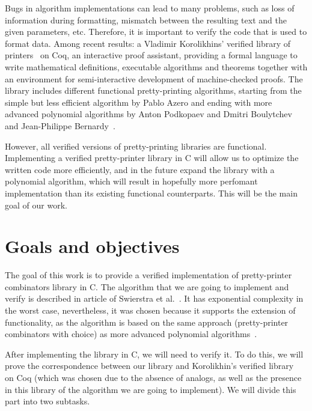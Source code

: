\documentclass[14pt]{constructor-diploma}
\begin{document}
Bugs in algorithm implementations can lead to many problems, such as loss of information during formatting,
mismatch between the resulting text and the given parameters, etc. Therefore, it is important to verify 
the code that is used to format data.
Among recent results: a Vladimir Korolikhins' verified library of printers~\cite{korolihin} on Coq, an interactive proof assistant, 
providing a formal language to write mathematical definitions, executable algorithms and theorems together with an environment for semi-interactive development of machine-checked proofs. 
The library includes different functional pretty-printing algorithms,
starting from the simple but less efficient algorithm by Pablo Azero and ending 
with more advanced polynomial algorithms by Anton Podkopaev and Dmitri Boulytchev~\cite{podkopaev} and Jean-Philippe Bernardy~\cite{bernardy}.

However, all verified versions of pretty-printing libraries are functional. 
Implementing a verified pretty-printer library in C will allow us to optimize the written code more efficiently, and in the future 
expand the library with a polynomial algorithm, which will result in hopefully more perfomant implementation than its existing functional counterparts.
This will be the main goal of our work.

\section{Goals and objectives}
The goal of this work is to provide a verified implementation of pretty-printer combinators library in C. 
The algorithm that we are going to implement and verify 
is described in article of Swierstra et al.~\cite{swierstra}. 
It has exponential complexity in the worst case, nevertheless, 
it was chosen because it supports the extension of functionality, 
as the algorithm is based on the same approach (pretty-printer combinators with choice) 
as more advanced polynomial algorithms~\cite{podkopaev,bernardy}. 

After implementing the library in C, we will need to verify it. 
To do this, we will prove the correspondence between our library and Korolikhin's verified library~\cite{korolihin} on Coq (which was chosen due to the absence of analogs, as well as the presence in this library of the algorithm we are going to implement).
We will divide this part into two subtasks. 
\end{document}
